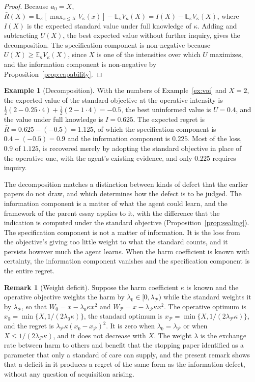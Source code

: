 \documentclass[11pt]{article}
\newcommand{\E}{\mathbb E}
\theoremstyle{plain}
\theoremstyle{definition}
\newtheorem{remark}{Remark}
\newtheorem{example}{Example}
\begin{document}
\begin{proof}
Because $a_0=X$, $\bar R(X)=\E_\kappa[\max_{x\le X}V_\kappa(x)]-\E_\kappa V_\kappa(X)=I(X)-\E_\kappa V_\kappa(X)$, where $I(X)$ is the expected standard value under full knowledge of $\kappa$. Adding and subtracting $U(X)$, the best expected value without further inquiry, gives the decomposition. The specification component is non-negative because $U(X)\ge\E_\kappa V_\kappa(X)$, since $X$ is one of the intensities over which $U$ maximizes, and the information component is non-negative by Proposition~\ref{prop:capability}.
\end{proof}

\begin{example}[Decomposition]\label{ex:decomp}
With the numbers of Example~\ref{ex:voi} and $X=2$, the expected value of the standard objective at the operative intensity is $\tfrac12(2-0.25\cdot4)+\tfrac12(2-1\cdot4)=-0.5$, the best uninformed value is $U=0.4$, and the value under full knowledge is $I=0.625$. The expected regret is $\bar R=0.625-(-0.5)=1.125$, of which the specification component is $0.4-(-0.5)=0.9$ and the information component is $0.225$. Most of the loss, $0.9$ of $1.125$, is recovered merely by adopting the standard objective in place of the operative one, with the agent's existing evidence, and only $0.225$ requires inquiry.
\end{example}

The decomposition matches a distinction between kinds of defect that the earlier papers do not draw, and which determines how the defect is to be judged. The information component is a matter of what the agent could learn, and the framework of the parent essay applies to it, with the difference that the indication is computed under the standard objective (Proposition~\ref{prop:sealing}). The specification component is not a matter of information. It is the loss from the objective's giving too little weight to what the standard counts, and it persists however much the agent learns. When the harm coefficient is known with certainty, the information component vanishes and the specification component is the entire regret.

\begin{remark}[Weight deficit]\label{rem:weight}
Suppose the harm coefficient $\kappa$ is known and the operative objective weights the harm by $\lambda_0\in[0,\lambda_{\mathcal P})$ while the standard weights it by $\lambda_{\mathcal P}$, so that $W_0=x-\lambda_0\kappa x^2$ and $W_{\mathcal P}=x-\lambda_{\mathcal P}\kappa x^2$. The operative optimum is $x_0=\min\{X,1/(2\lambda_0\kappa)\}$, the standard optimum is $x_{\mathcal P}=\min\{X,1/(2\lambda_{\mathcal P}\kappa)\}$, and the regret is $\lambda_{\mathcal P}\kappa(x_0-x_{\mathcal P})^2$. It is zero when $\lambda_0=\lambda_{\mathcal P}$ or when $X\le1/(2\lambda_{\mathcal P}\kappa)$, and it does not decrease with $X$. The weight $\lambda$ is the exchange rate between harm to others and benefit that the stopping paper \cite{flyxion2026stop} identified as a parameter that only a standard of care can supply, and the present remark shows that a deficit in it produces a regret of the same form as the information defect, without any question of acquisition arising.
\end{remark}
\end{document}
